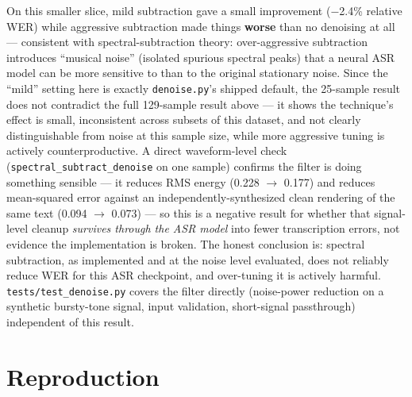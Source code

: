 \documentclass[11pt]{article}
\begin{document}
On this smaller slice, mild subtraction gave a small improvement ($-$2.4\% relative WER) while aggressive subtraction made things \textbf{worse} than no denoising at all --- consistent with spectral-subtraction theory: over-aggressive subtraction introduces ``musical noise'' (isolated spurious spectral peaks) that a neural ASR model can be more sensitive to than to the original stationary noise. Since the ``mild'' setting here is exactly \texttt{denoise.py}'s shipped default, the 25-sample result does not contradict the full 129-sample result above --- it shows the technique's effect is small, inconsistent across subsets of this dataset, and not clearly distinguishable from noise at this sample size, while more aggressive tuning is actively counterproductive. A direct waveform-level check (\texttt{spectral\_subtract\_denoise} on one sample) confirms the filter is doing something sensible --- it reduces RMS energy (0.228 $\to$ 0.177) and reduces mean-squared error against an independently-synthesized clean rendering of the same text (0.094 $\to$ 0.073) --- so this is a negative result for whether that signal-level cleanup \textit{survives through the ASR model} into fewer transcription errors, not evidence the implementation is broken. The honest conclusion is: spectral subtraction, as implemented and at the noise level evaluated, does not reliably reduce WER for this ASR checkpoint, and over-tuning it is actively harmful. \texttt{tests/test\_denoise.py} covers the filter directly (noise-power reduction on a synthetic bursty-tone signal, input validation, short-signal passthrough) independent of this result.

\section{Reproduction}
\end{document}
